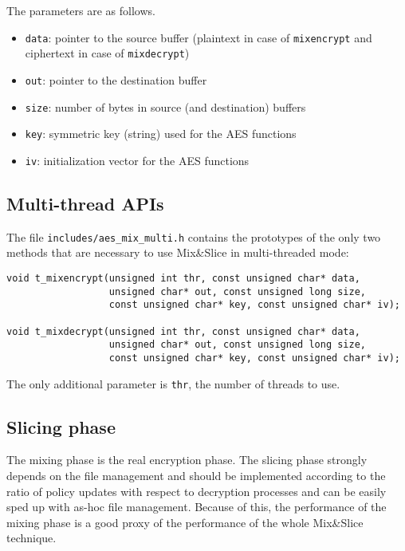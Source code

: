 The parameters are as follows.

\begin{itemize}
\tightlist
\item
  \texttt{data}: pointer to the source buffer (plaintext in case of
  \texttt{mixencrypt} and ciphertext in case of \texttt{mixdecrypt})
\item
  \texttt{out}: pointer to the destination buffer
\item
  \texttt{size}: number of bytes in source (and destination) buffers
\item
  \texttt{key}: symmetric key (string) used for the AES functions
\item
  \texttt{iv}: initialization vector for the AES functions
\end{itemize}

\subsection{Multi-thread APIs}\label{multi-thread-apis}

The file \texttt{includes/aes\_mix\_multi.h} contains the prototypes of
the only two methods that are necessary to use Mix\&Slice in
multi-threaded mode:

\begin{verbatim}
void t_mixencrypt(unsigned int thr, const unsigned char* data,
                  unsigned char* out, const unsigned long size,
                  const unsigned char* key, const unsigned char* iv);

void t_mixdecrypt(unsigned int thr, const unsigned char* data,
                  unsigned char* out, const unsigned long size,
                  const unsigned char* key, const unsigned char* iv);
\end{verbatim}

The only additional parameter is \texttt{thr}, the number of threads to
use.

\subsection{Slicing phase}\label{slicing-phase}

The mixing phase is the real encryption phase. The slicing phase
strongly depends on the file management and should be implemented
according to the ratio of policy updates with respect to decryption
processes and can be easily sped up with as-hoc file management. Because
of this, the performance of the mixing phase is a good proxy of the
performance of the whole Mix\&Slice technique.

